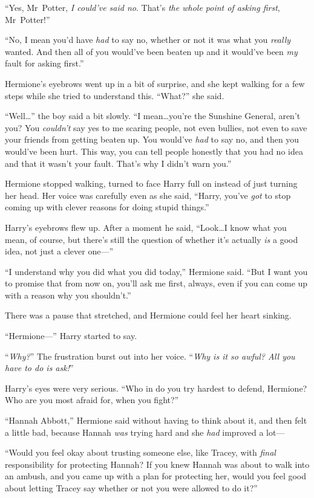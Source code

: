 “Yes, Mr~Potter, \emph{I could’ve said no}. That’s \emph{the whole point of asking first}, Mr~Potter!”

“No, I mean you’d have \emph{had} to say no, whether or not it was what you \emph{really} wanted. And then all of you would’ve been beaten up and it would’ve been \emph{my} fault for asking first.”

Hermione’s eyebrows went up in a bit of surprise, and she kept walking for a few steps while she tried to understand this. “What?” she said.

“Well…” the boy said a bit slowly. “I mean…you’re the Sunshine General, aren’t you? You \emph{couldn’t} say yes to me scaring people, not even bullies, not even to save your friends from getting beaten up. You would’ve \emph{had} to say no, and then you would’ve been hurt. This way, you can tell people honestly that you had no idea and that it wasn’t your fault. That’s why I didn’t warn you.”

Hermione stopped walking, turned to face Harry full on instead of just turning her head. Her voice was carefully even as she said, “Harry, you’ve \emph{got} to stop coming up with clever reasons for doing stupid things.”

Harry’s eyebrows flew up. After a moment he said, “Look…I know what you mean, of course, but there’s still the question of whether it’s actually \emph{is} a good idea, not just a clever one—”

“I understand why you did what you did today,” Hermione said. “But I want you to promise that from now on, you’ll ask me first, always, even if you can come up with a reason why you shouldn’t.”

There was a pause that stretched, and Hermione could feel her heart sinking.

“Hermione—” Harry started to say.

“\emph{Why?}” The frustration burst out into her voice. “\emph{Why is it so awful? All you have to do is ask!}”

Harry’s eyes were very serious. “Who in \SPHEW do you try hardest to defend, Hermione? Who are you most afraid for, when you fight?”

“Hannah Abbott,” Hermione said without having to think about it, and then felt a little bad, because Hannah \emph{was} trying hard and she \emph{had} improved a lot—

“Would you feel okay about trusting someone else, like Tracey, with \emph{final} responsibility for protecting Hannah? If you knew Hannah was about to walk into an ambush, and you came up with a plan for protecting her, would you feel good about letting Tracey say whether or not you were allowed to do it?”

